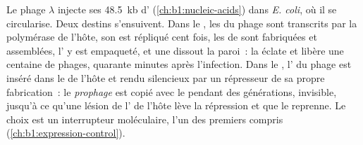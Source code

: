 \begin{proposition}\label{prop:b1:genomes:lambda}
Le phage $\lambda$ injecte ses \qty{48.5}{kb} d'
(\cref{ch:b1:nucleic-acids}) dans \emph{E. coli}, où il se circularise.
Deux destins s'ensuivent. Dans le \emph{}, les  du
phage sont transcrits par la polymérase de l'hôte, son  est répliqué
cent fois, les  de  sont fabriquées et assemblées, l'
y est empaqueté, et une  dissout la paroi~: la  éclate et
libère une centaine de phages, quarante minutes après l'infection. Dans
le \emph{}, l' du phage est inséré dans le
 de l'hôte et rendu silencieux par un répresseur de sa propre
fabrication~: le \emph{prophage} est copié avec le  pendant
des générations, invisible, jusqu'à ce qu'une lésion de l' de l'hôte
lève la répression et que le  reprenne. Le choix est un
interrupteur moléculaire, l'un des premiers compris
(\cref{ch:b1:expression-control}).
\end{proposition}

